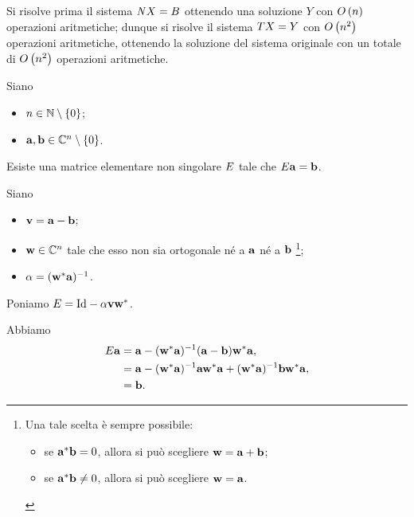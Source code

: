 \Proof Si risolve prima il sistema $\mathit{N} X = B$ ottenendo una soluzione
$Y$ con $O \left ( n \right )$ operazioni aritmetiche; dunque si risolve il sistema
$T X = Y$ con $O \left ( n^2 \right )$ operazioni aritmetiche,
ottenendo la soluzione del sistema originale con un totale di $O \left ( n^2 \right )$
operazioni aritmetiche. \EndProof
\begin{Theorem}
  Siano
  \begin{itemize}
    \item $n \in \mathbb{N} \setminus \lbrace 0 \rbrace$;
    \item $\mathbf{a}, \mathbf{b} \in \mathbb{C}^n \setminus \lbrace 0 \rbrace$.
  \end{itemize}
  Esiste una matrice elementare non singolare $E$ tale che
  $E\mathbf{a} = \mathbf{b}$.
\end{Theorem}
\Proof Siano
\begin{itemize}
  \item $\mathbf{v} = \mathbf{a} - \mathbf{b}$;
  \item $\mathbf{w} \in \mathbb{C}^n$ tale che esso non sia ortogonale n\'e a
    $\mathbf{a}$ n\'e a $\mathbf{b}$
    \footnote{Una tale scelta \`e sempre possibile:
    \begin{itemize}
      \item se ${\mathbf{a}}^*{\mathbf{b}} = 0$,
        allora si pu\`o scegliere
        $\mathbf{w} = \mathbf{a} + \mathbf{b}$;
      \item se ${\mathbf{a}}^*{\mathbf{b}} \neq 0$,
        allora si pu\`o scegliere
        $\mathbf{w} = \mathbf{a}$.
    \end{itemize}};
  \item $\alpha = ({\mathbf{w}}^*\mathbf{a})^{-1}$.
\end{itemize}
\par Poniamo
$\ElementaryMatrix
= \Identity - \Scalar\Vector\HermitianTransposed{\VarVector}$.
\par Abbiamo
\begin{align*}
  E \mathbf{a}
  &= \mathbf{a}
    - ({\mathbf{w}}^*\mathbf{a})^{-1}
    (\mathbf{a} - \mathbf{b})
    {\mathbf{w}}^*\mathbf{a},\\
  &= \mathbf{a}
    - ({\mathbf{w}}^*\mathbf{a})^{-1}
    \mathbf{a}
    {\mathbf{w}}^*\mathbf{a}
    + ({\mathbf{w}}^*\mathbf{a})^{-1}
    \mathbf{b}
    {\mathbf{w}}^*\mathbf{a},\\
  &= \mathbf{b}.
\end{align*}
